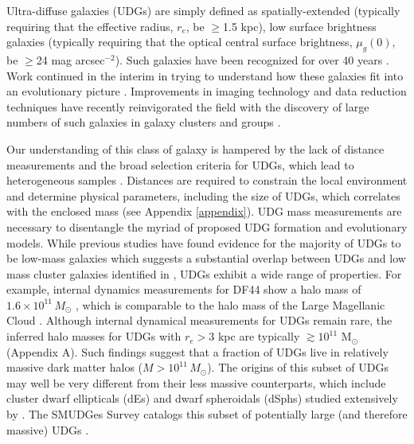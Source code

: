 \documentclass[twocolumn,tighten]{aastex63}
\begin{document}
Ultra-diffuse galaxies (UDGs) are simply defined as spatially-extended (typically requiring that the effective radius, $r_e$, be $\geq$1.5 kpc), low surface brightness galaxies (typically requiring that the optical central surface brightness, $\mu_g(0)$, be $\geq$24 mag arcsec$^{-2}$).
Such galaxies have been recognized for over 40 years \citep{Disney, Sandage1984, Vigroux1986, Impey1988, Bothun1991, McGaugh, Schwartzenberg1995, Dalcanton1997, Sprayberry1997, Conselice2003, Penny2008}. Work continued in the interim in trying to understand how these galaxies fit into an evolutionary picture \citep[e.g.,][]{Conselice2003, Sabatini2005, Penny2009, Penny2011, Penny2014}. Improvements in imaging technology and data reduction techniques  \citep[e.g.,][]{Mihos2005, Mihos2013, Slater2009, Abraham2014, vanDokkum2014, Zaritsky19, Infante} 
have recently reinvigorated the field with the discovery of large numbers of such galaxies in galaxy clusters and groups \citep{vanDokkum2015a, Koda2015, Mihos2015, Yagi2016, vanderburg2016, Mihos2017, Roman2017a, greco, Danieli2019, tanog}.

Our understanding of this class of galaxy is hampered by the lack of distance measurements and the broad selection criteria for UDGs, which lead to heterogeneous samples \citep{Martin2016, Merritt2016, Martinez-Delgado2016, Roman2017a, vanderburg2017, Leisman2017, Prole2019, Torrealba2019}. Distances are required to constrain the local environment and determine physical parameters, including the size of UDGs, which correlates with the enclosed mass (see Appendix \ref{appendix}). UDG mass measurements are necessary to disentangle the myriad of proposed UDG formation and evolutionary models. While previous studies have found evidence for the majority of UDGs to be low-mass galaxies \citep{Amorisco2016, Sifon2018} which suggests a substantial overlap between UDGs and low mass cluster galaxies identified in \cite{Conselice2003}, UDGs exhibit a wide range of properties. For example, internal dynamics measurements for DF44 show a halo mass of $1.6 \times 10^{11} \, M_\odot$ \citep{vanDokkum2019b}, which is comparable to the halo mass of the Large Magellanic Cloud \citep[$1.4 \times 10^{11} \, M_\odot$;][]{erkal}.
Although internal dynamical measurements for UDGs remain rare, the inferred halo masses for  UDGs with $r_e > 3$ kpc are typically $\gtrsim 10^{11}$ M$_\odot$ (Appendix A). Such findings suggest that a fraction of UDGs live in relatively massive dark matter halos ($M>10^{11} \, M_\odot$). The origins of this subset of UDGs may well be very different from their less massive counterparts, which include cluster dwarf ellipticals (dEs) and dwarf spheroidals (dSphs) studied extensively by \citep{Sandage1984, Conselice2003, Penny2009}. The SMUDGes Survey catalogs this subset of potentially large (and therefore massive) UDGs \citep{Zaritsky19}.
\end{document}
